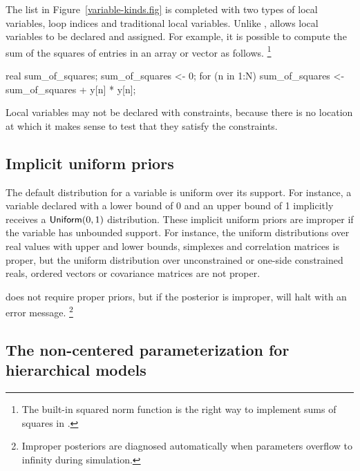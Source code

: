 \documentclass[article]{jss}
\begin{document}
The list in Figure~\ref{variable-kinds.fig} is completed with two
types of local variables, loop indices and traditional local
variables.  Unlike ,  allows local
variables to be declared and assigned.  For example, it is possible to
compute the sum of the squares of entries in an array or vector
 as follows.%
%
\footnote{The built-in squared norm function is the right way to
  implement sums of squares in .}
%
\begin{Code}
{ 
  real sum_of_squares;
  sum_of_squares <- 0;
  for (n in 1:N)
    sum_of_squares <- sum_of_squares + y[n] * y[n];
}  
\end{Code}
%
Local variables may not be declared with constraints, because there is
no location at which it makes sense to test that they satisfy the
constraints. 


\subsection{Implicit uniform priors}\label{implicit-prior.section}

The default distribution for a variable is uniform over its support.
For instance, a variable declared with a lower bound of 0 and an upper
bound of 1 implicitly receives a $\mbox{\sf Uniform}(0,1)$
distribution.  These implicit uniform priors are improper if the
variable has unbounded support.  For instance, the uniform
distributions over real values with upper and lower bounds, simplexes
and correlation matrices is proper, but the uniform distribution over
unconstrained or one-side constrained reals, ordered vectors or
covariance matrices are not proper.

 does not require proper priors, but if the posterior
is improper,  will halt with an error message.%
%
\footnote{Improper posteriors are diagnosed automatically when
  parameters overflow to infinity during simulation.}


\subsection{The non-centered parameterization for hierarchical models}\label{centering.section}
\end{document}
